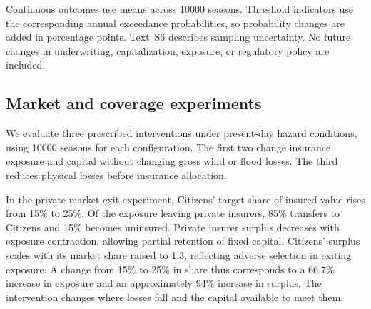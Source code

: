 Continuous outcomes use means across \num{10000} seasons. Threshold indicators use the corresponding annual exceedance probabilities, so probability changes are added in percentage points. Text~S6 describes sampling uncertainty. No future changes in underwriting, capitalization, exposure, or regulatory policy are included.

\subsection*{Market and coverage experiments}\label{MethodsPolicy}
We evaluate three prescribed interventions under present-day hazard conditions, using \num{10000} seasons for each configuration. The first two change insurance exposure and capital without changing gross wind or flood losses. The third reduces physical losses before insurance allocation.

In the private market exit experiment, Citizens' target share of insured value rises from 15\% to 25\%. Of the exposure leaving private insurers, 85\% transfers to Citizens and 15\% becomes uninsured. Private insurer surplus decreases with exposure contraction, allowing partial retention of fixed capital. Citizens' surplus scales with its market share raised to 1.3, reflecting adverse selection in exiting exposure. A change from 15\% to 25\% in share thus corresponds to a 66.7\% increase in exposure and an approximately 94\% increase in surplus. The intervention changes where losses fall and the capital available to meet them.

